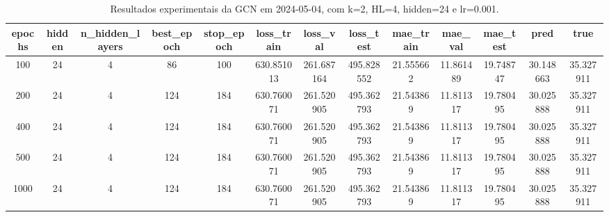 \begin{table}[h]
\centering
\caption{Resultados experimentais da GCN em 2024-05-04, com k=2, HL=4, hidden=24 e lr=0.001.}
\label{tab:gcn_results_k2_hl4_h24_d20240504}
\begin{tabular}{ccccccccccccc}
\toprule
epochs & hidden & n\_hidden\_layers & best\_epoch & stop\_epoch & loss\_train & loss\_val & loss\_test & mae\_train & mae\_val & mae\_test & pred & true \\
\midrule
100 & 24 & 4 & 86 & 100 & 630.851013 & 261.687164 & 495.828552 & 21.555662 & 11.861489 & 19.748747 & 30.148663 & 35.327911 \\
200 & 24 & 4 & 124 & 184 & 630.760071 & 261.520905 & 495.362793 & 21.543869 & 11.811317 & 19.780495 & 30.025888 & 35.327911 \\
400 & 24 & 4 & 124 & 184 & 630.760071 & 261.520905 & 495.362793 & 21.543869 & 11.811317 & 19.780495 & 30.025888 & 35.327911 \\
500 & 24 & 4 & 124 & 184 & 630.760071 & 261.520905 & 495.362793 & 21.543869 & 11.811317 & 19.780495 & 30.025888 & 35.327911 \\
1000 & 24 & 4 & 124 & 184 & 630.760071 & 261.520905 & 495.362793 & 21.543869 & 11.811317 & 19.780495 & 30.025888 & 35.327911 \\
\bottomrule
\end{tabular}
\end{table}
